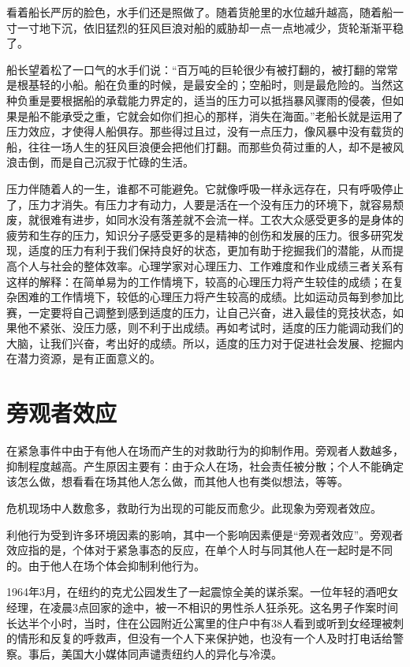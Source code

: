 \documentclass[11pt]{ctexart}
\begin{document}
看着船长严厉的脸色，水手们还是照做了。随着货舱里的水位越升越高，随着船一寸一寸地下沉，依旧猛烈的狂风巨浪对船的威胁却一点一点地减少，货轮渐渐平稳了。

船长望着松了一口气的水手们说：“百万吨的巨轮很少有被打翻的，被打翻的常常是根基轻的小船。船在负重的时候，是最安全的；空船时，则是最危险的。当然这种负重是要根据船的承载能力界定的，适当的压力可以抵挡暴风骤雨的侵袭，但如果是船不能承受之重，它就会如你们担心的那样，消失在海面。”老船长就是运用了压力效应，才使得人船俱存。那些得过且过，没有一点压力，像风暴中没有载货的船，往往一场人生的狂风巨浪便会把他们打翻。而那些负荷过重的人，却不是被风浪击倒，而是自己沉寂于忙碌的生活。

压力伴随着人的一生，谁都不可能避免。它就像呼吸一样永远存在，只有呼吸停止了，压力才消失。有压力才有动力，人要是活在一个没有压力的环境下，就容易颓废，就很难有进步，如同水没有落差就不会流一样。工农大众感受更多的是身体的疲劳和生存的压力，知识分子感受更多的是精神的创伤和发展的压力。很多研究发现，适度的压力有利于我们保持良好的状态，更加有助于挖掘我们的潜能，从而提高个人与社会的整体效率。心理学家对心理压力、工作难度和作业成绩三者关系有这样的解释：在简单易为的工作情境下，较高的心理压力将产生较佳的成绩；在复杂困难的工作情境下，较低的心理压力将产生较高的成绩。比如运动员每到参加比赛，一定要将自己调整到感到适度的压力，让自己兴奋，进入最佳的竞技状态，如果他不紧张、没压力感，则不利于出成绩。再如考试时，适度的压力能调动我们的大脑，让我们兴奋，考出好的成绩。所以，适度的压力对于促进社会发展、挖掘内在潜力资源，是有正面意义的。
\section{旁观者效应}
\label{sec-77}


在紧急事件中由于有他人在场而产生的对救助行为的抑制作用。旁观者人数越多，抑制程度越高。产生原因主要有：由于众人在场，社会责任被分散；个人不能确定该怎么做，想看看在场其他人怎么做，而其他人也有类似想法，等等。

危机现场中人数愈多，救助行为出现的可能反而愈少。此现象为旁观者效应。

利他行为受到许多环境因素的影响，其中一个影响因素便是“旁观者效应”。旁观者效应指的是，个体对于紧急事态的反应，在单个人时与同其他人在一起时是不同的。由于他人在场个体会抑制利他行为。

1964年3月，在纽约的克尤公园发生了一起震惊全美的谋杀案。一位年轻的酒吧女经理，在凌晨3点回家的途中，被一不相识的男性杀人狂杀死。这名男子作案时间长达半个小时，当时，住在公园附近公寓里的住户中有38人看到或听到女经理被刺的情形和反复的呼救声，但没有一个人下来保护她，也没有一个人及时打电话给警察。事后，美国大小媒体同声谴责纽约人的异化与冷漠。
\end{document}
